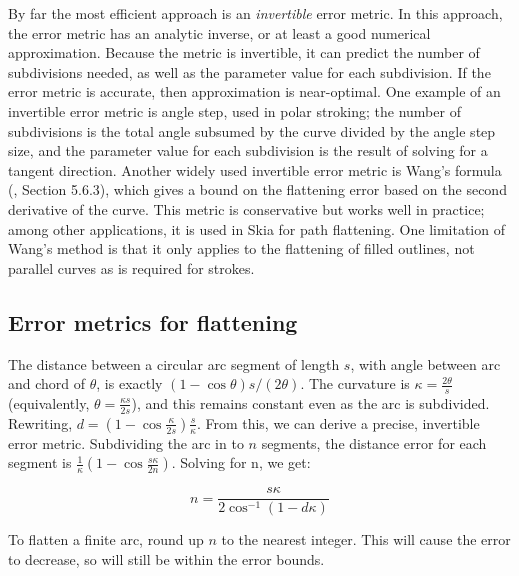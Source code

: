 \documentclass[format=acmsmall]{acmart}
\begin{document}
By far the most efficient approach is an \emph{invertible} error metric. In this approach, the error metric has an analytic inverse, or at least a good numerical approximation. Because the metric is invertible, it can predict the number of subdivisions needed, as well as the parameter value for each subdivision. If the error metric is accurate, then approximation is near-optimal. One example of an invertible error metric is angle step, used in polar stroking\cite{Kilgard2020}; the number of subdivisions is the total angle subsumed by the curve divided by the angle step size, and the parameter value for each subdivision is the result of solving for a tangent direction. Another widely used invertible error metric is Wang's formula (\cite{Goldman2003}, Section 5.6.3), which gives a bound on the flattening error based on the second derivative of the curve. This metric is conservative but works well in practice; among other applications, it is used in Skia for path flattening. One limitation of Wang's method is that it only applies to the flattening of filled outlines, not parallel curves as is required for strokes.


\subsection{Error metrics for flattening}

The distance between a circular arc segment of length $s$, with angle between arc and chord of $\theta$, is exactly $(1-\cos \theta)s/(2\theta)$. The curvature is $\kappa = \frac{2\theta}{s}$ (equivalently, $\theta = \frac{\kappa s}{2s}$), and this remains constant even as the arc is subdivided. Rewriting, $d = (1-\cos\frac{\kappa}{2s})\frac{s}{\kappa}$. From this, we can derive a precise, invertible error metric. Subdividing the arc in to $n$ segments, the distance error for each segment is $\frac{1}{\kappa}(1-\cos \frac{s\kappa}{2n})$. Solving for n, we get:

\[
n = \frac{s\kappa}{2\cos^{-1}\left( 1- d\kappa \right)}
\]

To flatten a finite arc, round up $n$ to the nearest integer. This will cause the error to decrease, so will still be within the error bounds.
\end{document}
